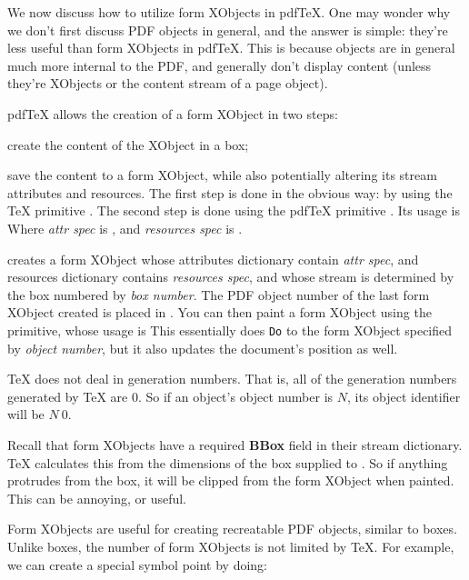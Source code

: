 We now discuss how to utilize form XObjects in pdf\TeX.
One may wonder why we don't first discuss PDF objects in general, and the answer is simple: they're less
useful than form XObjects in pdf\TeX.
This is because objects are in general much more internal to the PDF, and generally don't display content
(unless they're XObjects or the content stream of a page object).

pdf\TeX{} allows the creation of a form XObject in two steps:
\benum
    \item create the content of the XObject in a box;
    \item save the content to a form XObject, while also potentially altering its stream attributes and
    resources.
\eenum
\noindent The first step is done in the obvious way: by using the \TeX{} primitive \macro\setbox.
The second step is done using the pdf\TeX{} primitive \macro\pdfxform.
Its usage is
\noindent Where {\it attr spec} is , and {\it resources spec} is
.

\macro\pdfxform{} creates a form XObject whose attributes dictionary contain {\it attr spec}, and resources
dictionary contains {\it resources spec}, and whose stream is determined by the box numbered by {\it box
number}.
The PDF object number of the last form XObject created is placed in \macro\pdflastxform.
You can then paint a form XObject using the \macro\pdfrefxform{} primitive, whose usage is
\noindent This essentially does {\tt Do} to the form XObject specified by {\it object number}, but it also
updates the document's position as well.

\bnote
    \TeX{} does not deal in generation numbers.
    That is, all of the generation numbers generated by \TeX{} are 0.
    So if an object's object number is $N$, its object identifier will be $N\ 0$.
\eppbox

\bnote
    Recall that form XObjects have a required {\bf BBox} field in their stream dictionary.
    \TeX{} calculates this from the dimensions of the box supplied to \macro\pdfxform.
    So if anything protrudes from the box, it will be clipped from the form XObject when painted.
    This can be annoying, or useful.
\eppbox

Form XObjects are useful for creating recreatable PDF objects, similar to boxes.
Unlike boxes, the number of form XObjects is not limited by \TeX.
For example, we can create a special symbol point by doing:

